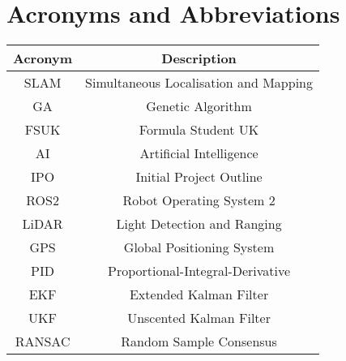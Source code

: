 \section{Acronyms and Abbreviations}\label{sec:acronyms-abbreviations}
\begin{center}
    \begin{tabular}{ |c|c| }
        \hline
        \textbf{Acronym} & \textbf{Description} \\
        \hline
        SLAM & Simultaneous Localisation and Mapping \\
        GA & Genetic Algorithm \\
        FSUK & Formula Student UK \\
        AI & Artificial Intelligence \\
        IPO & Initial Project Outline \\
        ROS2 & Robot Operating System 2 \\
        LiDAR & Light Detection and Ranging \\
        GPS & Global Positioning System \\
        PID & Proportional-Integral-Derivative \\
        EKF & Extended Kalman Filter \\
        UKF & Unscented Kalman Filter \\
        RANSAC & Random Sample Consensus \\
        \hline
    \end{tabular}
\end{center}